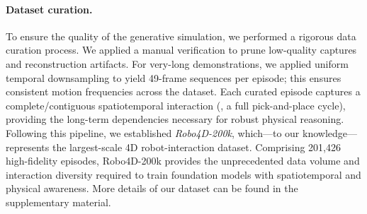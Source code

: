 \paragraph{Dataset curation.}
To ensure the quality of the generative simulation, we performed a rigorous data curation process. We applied a manual verification to prune low-quality captures and reconstruction artifacts. For very-long demonstrations, we applied uniform temporal downsampling to yield 49-frame sequences per episode; this ensures consistent motion frequencies across the dataset.
Each curated episode captures a complete/contiguous spatiotemporal interaction (\eg, a full pick-and-place cycle), providing the long-term dependencies necessary for robust physical reasoning.
Following this pipeline, we established \textit{Robo4D-200k}, which—to our knowledge—represents the largest-scale 4D robot-interaction dataset. Comprising 201,426 high-fidelity episodes, Robo4D-200k provides the unprecedented data volume and interaction diversity required to train foundation models with spatiotemporal and physical awareness. More details of our dataset can be found in the supplementary material.